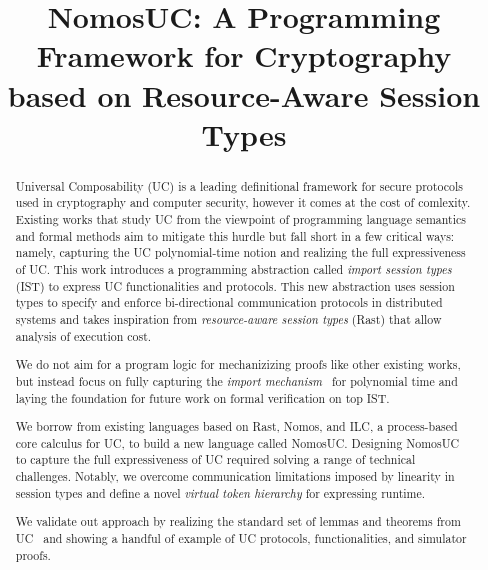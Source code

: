 \documentclass[acmsmall,screen,review,anonymous]{acmart}
\begin{document}
\title{NomosUC: A Programming Framework for Cryptography based on Resource-Aware Session Types\\
}




\begin{abstract}
  Universal Composability (UC) is a leading definitional framework for secure protocols used in cryptography and computer security, however it comes at the cost of comlexity.
  Existing works that study UC from the viewpoint of programming language semantics and formal methods aim to mitigate this hurdle but fall short in a few critical ways:
  namely, capturing the UC polynomial-time notion and realizing the full expressiveness of UC.
  This work introduces a programming abstraction called \emph{import
  session types} (IST) to express UC functionalities and protocols.
  This new abstraction uses session types to specify and enforce bi-directional communication protocols in distributed systems and
  takes inspiration from \emph{resource-aware session types} (Rast) that allow analysis of execution cost.

  We do not aim for a program logic for mechanizizing proofs like other existing works, but instead focus on fully capturing the \emph{import mechanism}~\cite{canettiUC} for polynomial time and laying the foundation for future work on formal verification on top IST.

  We borrow from existing languages based on Rast, Nomos, and ILC, a process-based core calculus for UC,
  to build a new language called NomosUC. Designing NomosUC to capture the full expressiveness of UC 
  required solving a range of technical challenges. Notably, we overcome communication limitations imposed 
  by linearity in session types and define a novel \emph{virtual token hierarchy} for expressing runtime.

  We validate out approach by realizing the standard set of lemmas and theorems from UC~\cite{canettiUC,ilc,gnuc,ipdl,easyuc}
  and showing a handful of example of UC protocols, functionalities, and simulator proofs.
\end{abstract}
\end{document}

